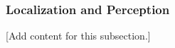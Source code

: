 
\subsubsection{Localization and Perception}
\label{subsubsec:design_5_4_localization_perception}

[Add content for this subsection.]
